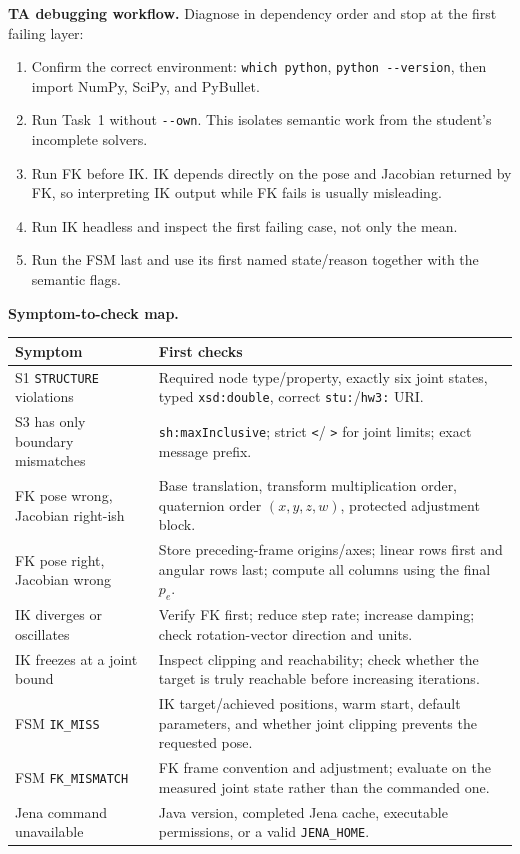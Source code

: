 \documentclass[11pt]{article}
\newcommand{\code}[1]{\nolinkurl{#1}}
\begin{document}
\begin{tutornote}
\textbf{TA debugging workflow.} Diagnose in dependency order and stop at the
first failing layer:
\begin{enumerate}
  \item Confirm the correct environment: \texttt{which python},
    \texttt{python {-}{-}version}, then import NumPy, SciPy, and PyBullet.
  \item Run Task~1 without \code{--own}. This isolates semantic work from the
    student's incomplete solvers.
  \item Run FK before IK. IK depends directly on the pose and Jacobian returned
    by FK, so interpreting IK output while FK fails is usually misleading.
  \item Run IK headless and inspect the first failing case, not only the mean.
  \item Run the FSM last and use its first named state/reason together with the
    semantic flags.
\end{enumerate}

\textbf{Symptom-to-check map.}

{\renewcommand{\arraystretch}{1.15}
\begin{longtable}{L{.31\linewidth}L{.59\linewidth}}
\toprule
\textbf{Symptom} & \textbf{First checks}\\
\midrule
S1 \code{STRUCTURE} violations & Required node type/property, exactly six
joint states, typed \code{xsd:double}, correct \code{stu:}/\code{hw3:} URI.\\
S3 has only boundary mismatches & \code{sh:maxInclusive}; strict \code{<}/
\code{>} for joint limits; exact message prefix.\\
FK pose wrong, Jacobian right-ish & Base translation, transform multiplication
order, quaternion order $(x,y,z,w)$, protected adjustment block.\\
FK pose right, Jacobian wrong & Store preceding-frame origins/axes; linear rows
first and angular rows last; compute all columns using the final $p_e$.\\
IK diverges or oscillates & Verify FK first; reduce step rate; increase damping;
check rotation-vector direction and units.\\
IK freezes at a joint bound & Inspect clipping and reachability; check whether
the target is truly reachable before increasing iterations.\\
FSM \code{IK_MISS} & IK target/achieved positions, warm start, default
parameters, and whether joint clipping prevents the requested pose.\\
FSM \code{FK_MISMATCH} & FK frame convention and adjustment; evaluate on the
measured joint state rather than the commanded one.\\
Jena command unavailable & Java version, completed Jena cache, executable
permissions, or a valid \code{JENA_HOME}.\\
\bottomrule
\end{longtable}}


\end{tutornote}
\end{document}
